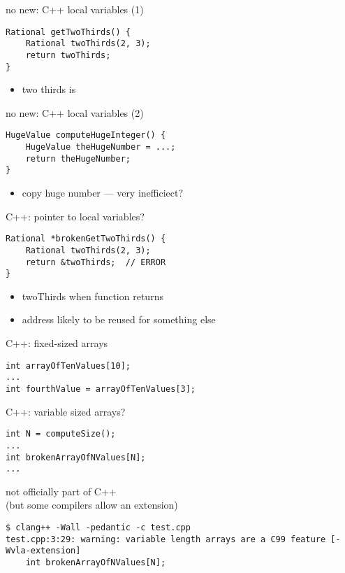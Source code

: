 \begin{frame}[fragile,label=noNewObjects]{no new: C++ local variables (1)}
\lstset{language=C++,style=small}
\begin{lstlisting}
Rational getTwoThirds() {
    Rational twoThirds(2, 3);
    return twoThirds;
}
\end{lstlisting}
    \begin{itemize}
        \item two thirds is 
    \end{itemize}
\end{frame}

\begin{frame}[fragile,label=noNewObjects]{no new: C++ local variables (2)}
\lstset{language=C++,style=small}
\begin{lstlisting}
HugeValue computeHugeInteger() {
    HugeValue theHugeNumber = ...;
    return theHugeNumber;
}
\end{lstlisting}
    \begin{itemize}
        \item copy huge number --- very inefficiect?
    \end{itemize}
\end{frame}

\begin{frame}[fragile,label=pointerToLocal]{C++: pointer to local variables?}
\lstset{language=C++,style=small}
\begin{lstlisting}
Rational *brokenGetTwoThirds() {
    Rational twoThirds(2, 3);
    return &twoThirds;  // ERROR
}
\end{lstlisting}
\begin{itemize}
    \item twoThirds  when function returns
\item address likely to be reused for something else
\end{itemize}
\end{frame}

\begin{frame}[fragile,label=cppArray]{C++: fixed-sized arrays}
\lstset{language=C++,style=small}
\begin{lstlisting}
int arrayOfTenValues[10];
...
int fourthValue = arrayOfTenValues[3];
\end{lstlisting}
\end{frame}

\begin{frame}[fragile,label=cppArray]{C++: variable sized arrays?}
\lstset{language=C++,style=small}
\begin{lstlisting}
int N = computeSize();
...
int brokenArrayOfNValues[N];
...
\end{lstlisting}
not officially part of C++ \\
(but some compilers allow an extension)
\begin{Verbatim}[fontsize=\tiny]
$ clang++ -Wall -pedantic -c test.cpp
test.cpp:3:29: warning: variable length arrays are a C99 feature [-Wvla-extension]
    int brokenArrayOfNValues[N];
\end{Verbatim}
\end{frame}
